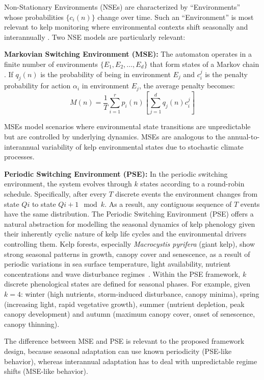 \documentclass[12pt,oneside]{book}
\begin{document}
Non-Stationary Environments (NSEs) are characterized by ``Environments'' whose probabilities $\{c_i(n)\}$ change over time. Such an ``Environment'' is most relevant to kelp monitoring where environmental contexts shift seasonally and interannually \citep{Bisong2018, Varshavskii1965}. Two NSE models are particularly relevant:

\textbf{Markovian Switching Environment (MSE):} The automaton operates in a finite number of environments $\{E_1, E_2, \ldots, E_d\}$ that form states of a Markov chain \citep{Cogburn1984}. If $q_j(n)$ is the probability of being in environment $E_j$ and $c_i^j$ is the penalty probability for action $\alpha_i$ in environment $E_j$, the average penalty becomes:
\begin{equation}
    M(n) = \frac{1}{T}\sum_{i=1}^{r} p_i(n) \left[\sum_{j=1}^{d} q_j(n) c_i^j\right]
\end{equation}

MSEs model scenarios where environmental state transitions are unpredictable but are controlled by underlying dynamics. MSEs are analogous to the annual-to-interannual variability of kelp environmental states due to stochastic climate processes.

\textbf{Periodic Switching Environment (PSE):} In the periodic switching environment, the system evolves through $k$ states according to a round-robin schedule. Specifically, after every $T$ discrete events the environment changes from state $Qi$ to state $Q{i+1 \mod k}$. As a result, any contiguous sequence of $T$ events have the same distribution. The Periodic Switching Environment (PSE) offers a natural abstraction for modelling the seasonal dynamics of kelp phenology given their inherently cyclic nature of kelp life cycles and the environmental drivers controlling them. Kelp forests, especially \textit{Macrocystis pyrifera} (giant kelp), show strong seasonal patterns in growth, canopy cover and senescence, as a result of periodic variations in sea surface temperature, light availability, nutrient concentrations and wave disturbance regimes~\cite{Schiel2015, Reed2008}. Within the PSE framework, $k$ discrete phenological states are defined for seasonal phases. For example, given $k = 4$: winter (high nutrients, storm-induced disturbance, canopy minima), spring (increasing light, rapid vegetative growth), summer (nutrient depletion, peak canopy development) and autumn (maximum canopy cover, onset of senescence, canopy thinning).

The difference between MSE and PSE is relevant to the proposed framework design, because seasonal adaptation can use known periodicity (PSE-like behavior), whereas interannual adaptation has to deal with unpredictable regime shifts (MSE-like behavior).
\end{document}
